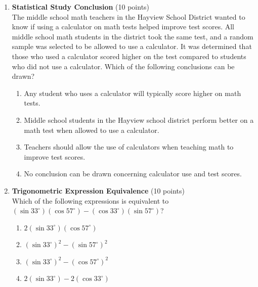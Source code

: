 \begin{enumerate}
  \item \textbf{Statistical Study Conclusion} (10 points)\\
  The middle school math teachers in the Hayview School District wanted to know if 
  using a calculator on math tests helped improve test scores. All middle school math 
  students in the district took the same test, and a random sample was selected to be 
  allowed to use a calculator. It was determined that those who used a calculator 
  scored higher on the test compared to students who did not use a calculator. Which 
  of the following conclusions can be drawn?
  \begin{enumerate}[label=(\Alph*)]
    \item Any student who uses a calculator will typically score higher on math tests.
    \item Middle school students in the Hayview school district perform better on a math test when allowed to use a calculator.
    \item Teachers should allow the use of calculators when teaching math to improve test scores.
    \item No conclusion can be drawn concerning calculator use and test scores.
  \end{enumerate}
  \begin{subanswer}
  \end{subanswer}


  \newpage







  \item \textbf{Trigonometric Expression Equivalence} (10 points)\\
  Which of the following expressions is equivalent to 
  $\left(\sin 33^{\circ}\right)\left(\cos 57^{\circ}\right)-\left(\cos 33^{\circ}\right)\left(\sin 57^{\circ}\right)$?
  \begin{enumerate}[label=(\Alph*)]
    \item $2\left(\sin 33^{\circ}\right)\left(\cos 57^{\circ}\right)$
    \item $\left(\sin 33^{\circ}\right)^2-\left(\sin 57^{\circ}\right)^2$
    \item $\left(\sin 33^{\circ}\right)^2-\left(\cos 57^{\circ}\right)^2$
    \item $2\left(\sin 33^{\circ}\right)-2\left(\cos 33^{\circ}\right)$
  \end{enumerate}
  \begin{subanswer}
  \end{subanswer}



\end{enumerate}
